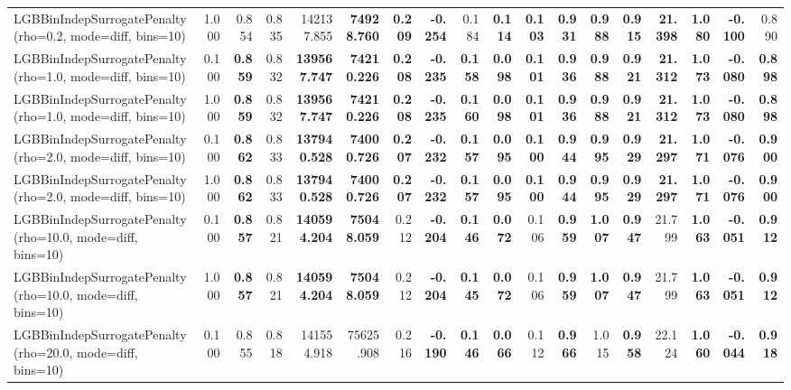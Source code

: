 \documentclass[11pt]{article}
\theoremstyle{plain}
\theoremstyle{definition}
\newcommand{\1}{\mathbf{1}}
\begin{document}
\begin{table}[htbp]
{\begin{tabular}{lrrrrrrrrrrrrrrrrr}
LGBBinIndepSurrogatePenalty(rho=0.2, mode=diff, bins=10) & 1.000 & 0.854 & 0.835 & 142137.855 & \textbf{74928.760} & \textbf{0.209} & \textbf{-0.254} & 0.184 & \textbf{0.114} & \textbf{0.103} & \textbf{0.931} & \textbf{0.988} & \textbf{0.915} & \textbf{21.398} & \textbf{1.080} & \textbf{-0.100} & 0.890 \\
LGBBinIndepSurrogatePenalty(rho=1.0, mode=diff, bins=10) & 0.100 & \textbf{0.859} & 0.832 & \textbf{139567.747} & \textbf{74210.226} & \textbf{0.208} & \textbf{-0.235} & \textbf{0.158} & \textbf{0.098} & \textbf{0.101} & \textbf{0.936} & \textbf{0.988} & \textbf{0.921} & \textbf{21.312} & \textbf{1.073} & \textbf{-0.080} & \textbf{0.898} \\
LGBBinIndepSurrogatePenalty(rho=1.0, mode=diff, bins=10) & 1.000 & \textbf{0.859} & 0.832 & \textbf{139567.747} & \textbf{74210.226} & \textbf{0.208} & \textbf{-0.235} & \textbf{0.160} & \textbf{0.098} & \textbf{0.101} & \textbf{0.936} & \textbf{0.988} & \textbf{0.921} & \textbf{21.312} & \textbf{1.073} & \textbf{-0.080} & \textbf{0.898} \\
LGBBinIndepSurrogatePenalty(rho=2.0, mode=diff, bins=10) & 0.100 & \textbf{0.862} & 0.833 & \textbf{137940.528} & \textbf{74000.726} & \textbf{0.207} & \textbf{-0.232} & \textbf{0.157} & \textbf{0.095} & \textbf{0.100} & \textbf{0.944} & \textbf{0.995} & \textbf{0.929} & \textbf{21.297} & \textbf{1.071} & \textbf{-0.076} & \textbf{0.900} \\
LGBBinIndepSurrogatePenalty(rho=2.0, mode=diff, bins=10) & 1.000 & \textbf{0.862} & 0.833 & \textbf{137940.528} & \textbf{74000.726} & \textbf{0.207} & \textbf{-0.232} & \textbf{0.157} & \textbf{0.095} & \textbf{0.100} & \textbf{0.944} & \textbf{0.995} & \textbf{0.929} & \textbf{21.297} & \textbf{1.071} & \textbf{-0.076} & \textbf{0.900} \\
LGBBinIndepSurrogatePenalty(rho=10.0, mode=diff, bins=10) & 0.100 & \textbf{0.857} & 0.821 & \textbf{140594.204} & \textbf{75048.059} & 0.212 & \textbf{-0.204} & \textbf{0.146} & \textbf{0.072} & 0.106 & \textbf{0.959} & \textbf{1.007} & \textbf{0.947} & 21.799 & \textbf{1.063} & \textbf{-0.051} & \textbf{0.912} \\
LGBBinIndepSurrogatePenalty(rho=10.0, mode=diff, bins=10) & 1.000 & \textbf{0.857} & 0.821 & \textbf{140594.204} & \textbf{75048.059} & 0.212 & \textbf{-0.204} & \textbf{0.145} & \textbf{0.072} & 0.106 & \textbf{0.959} & \textbf{1.007} & \textbf{0.947} & 21.799 & \textbf{1.063} & \textbf{-0.051} & \textbf{0.912} \\
LGBBinIndepSurrogatePenalty(rho=20.0, mode=diff, bins=10) & 0.100 & 0.855 & 0.818 & 141554.918 & 75625.908 & 0.216 & \textbf{-0.190} & \textbf{0.146} & \textbf{0.066} & 0.112 & \textbf{0.966} & 1.015 & \textbf{0.958} & 22.124 & \textbf{1.060} & \textbf{-0.044} & \textbf{0.918} \\

\end{tabular}}
\end{table}
\end{document}
